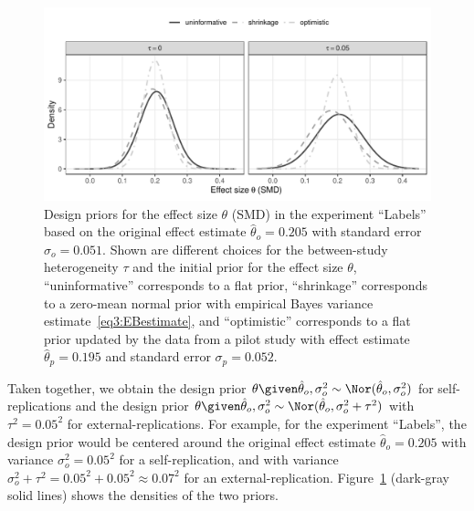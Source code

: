 \begin{figure}[!ht]
\begin{knitrout}
\color{fgcolor}
\includegraphics[width=\textwidth]{images/paper3/example-design-prior-1}
\end{knitrout}

\caption{Design priors for the effect size $\theta$ (SMD) in the experiment
  ``Labels'' based on the original effect estimate
  $\hat{\theta}_{o} = 0.205$ with standard error
  $\sigma_{o} = 0.051$. Shown are different
  choices for the between-study heterogeneity $\tau$ and the initial prior for
  the effect size $\theta$, ``uninformative'' corresponds to a flat prior,
  ``shrinkage'' corresponds to a zero-mean normal prior with empirical Bayes
  variance estimate~\eqref{eq3:EBestimate}, and ``optimistic'' corresponds to a
  flat prior updated by the data from a pilot study with effect estimate
  $\hat{\theta}_{p} = 0.195$ and standard error
  $\sigma_{p} = 0.052$.}
\label{fig3:dpexample}
\end{figure}



Taken together, we obtain the design prior
$\theta \given \hat{\theta}_{o}, \sigma^{2}_{o} \sim \Nor(\hat{\theta}_{o}, \sigma^{2}_{o})$
for self-replications and the design prior
$\theta \given \hat{\theta}_{o}, \sigma^{2}_{o} \sim \Nor(\hat{\theta}_{o}, \sigma^{2}_{o} + \tau^{2})$
with $\tau^{2} = 0.05^{2}$ for external-replications. For
example, for the experiment ``Labels'', the design prior would be
centered around the original effect estimate
$\hat{\theta}_{o} = 0.205$ with variance
$\sigma^{2}_{o} = 0.05^{2}$ for a
self-replication, and with variance
\mbox{$\sigma^{2}_{o} + \tau^{2} = 0.05^{2} + 0.05^{2} \approx 0.07^{2}$}
for an external-replication. Figure~\ref{fig3:dpexample} (dark-gray solid lines)
shows the densities of the two priors.

